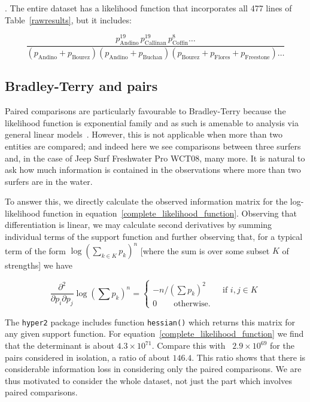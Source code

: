 \documentclass{article}
\begin{document}
.  The entire dataset has a likelihood function
that incorporates all 477 lines of Table~\ref{rawresults}, but it
includes:

\begin{equation}\label{complete_likelihood_function}
\frac{
p_\mathrm{Andino}^{19}\, p_\mathrm{Callinan}^{19}\, p_\mathrm{Coffin}^{8}\ldots
}{
(p_\mathrm{Andino} + p_\mathrm{Bourez})  (p_\mathrm{Andino} + p_\mathrm{Buchan})(p_\mathrm{Bourez} + p_\mathrm{Flores} + p_\mathrm{Freestone})\ldots
}
\end{equation}


\subsection{Bradley-Terry and pairs}

Paired comparisons are particularly favourable to Bradley-Terry
because the likelihood function is exponential family and as such is
amenable to analysis via general linear models~\citep{turner2012}.
However, this is not applicable when more than two entities are
compared; and indeed here we see comparisons between three surfers
and, in the case of Jeep Surf Freshwater Pro WCT08, many more.  It
is natural to ask how much information is contained in the
observations where more than two surfers are in the water.

To answer this, we directly calculate the observed information matrix
for the log-likelihood function in
equation~\ref{complete_likelihood_function}.  Observing that
differentiation is linear, we may calculate second derivatives by
summing individual terms of the support function and further observing
that, for a typical term of the form $\log\left(\sum_{k\in K}
p_k\right)^n$ [where the sum is over some subset $K$ of strengths] we
have

\begin{equation}
  \frac{\partial^2}{\partial p_i\partial p_j}
  \log\left(\sum p_k\right)^n=
  \begin{cases}
    -n/\left(\sum p_k\right)^2\qquad\mbox{if $i,j\in K$}\\
    0\qquad\mbox{otherwise.}
    \end{cases}
\end{equation}

The {\tt hyper2} package includes function {\tt hessian()} which
returns this matrix for any given support function.  For
equation~\ref{complete_likelihood_function} we find that the
determinant is about $4.3\times 10^{71}$.  Compare this with
~$2.9\times 10^{69}$ for the pairs considered in isolation, a ratio of
about $146.4$.  This ratio shows that there is considerable
information loss in considering only the paired comparisons.  We are
thus motivated to consider the whole dataset, not just the part which
involves paired comparisons.
\end{document}
